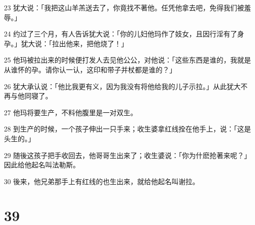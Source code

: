 \par 23 犹大说：「我把这山羊羔送去了，你竟找不著他。任凭他拿去吧，免得我们被羞辱。」
\par 24 约过了三个月，有人告诉犹大说：「你的儿妇他玛作了妓女，且因行淫有了身孕。」犹大说：「拉出他来，把他烧了！」
\par 25 他玛被拉出来的时候便打发人去见他公公，对他说：「这些东西是谁的，我就是从谁怀的孕。请你认一认，这印和带子并杖都是谁的？」
\par 26 犹大承认说：「他比我更有义，因为我没有将他给我的儿子示拉。」从此犹大不再与他同寝了。
\par 27 他玛将要生产，不料他腹里是一对双生。
\par 28 到生产的时候，一个孩子伸出一只手来；收生婆拿红线拴在他手上，说：「这是头生的。」
\par 29 随後这孩子把手收回去，他哥哥生出来了；收生婆说：「你为什麽抢著来呢？」因此给他起名叫法勒斯。
\par 30 後来，他兄弟那手上有红线的也生出来，就给他起名叫谢拉。

\chapter{39}

